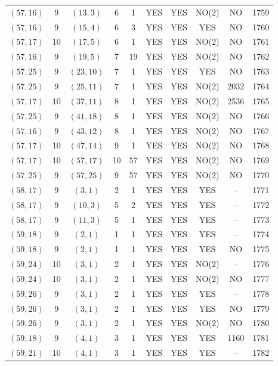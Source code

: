 \begin{longtable}{|c|c|c|c|c|c|c|c|c|c|}
$(57, 16)$ & 9 & $(13, 3)$ & 6 & 1 & YES & YES & NO(2) & NO & 1759\\
$(57, 16)$ & 9 & $(15, 4)$ & 6 & 3 & YES & YES & YES & NO & 1760\\
$(57, 17)$ & 10 & $(17, 5)$ & 6 & 1 & YES & YES & NO(2) & NO & 1761\\
$(57, 16)$ & 9 & $(19, 5)$ & 7 & 19 & YES & YES & NO(2) & NO & 1762\\
$(57, 25)$ & 9 & $(23, 10)$ & 7 & 1 & YES & YES & YES & NO & 1763\\
$(57, 25)$ & 9 & $(25, 11)$ & 7 & 1 & YES & YES & NO(2) & 2032 & 1764\\
$(57, 17)$ & 10 & $(37, 11)$ & 8 & 1 & YES & YES & NO(2) & 2536 & 1765\\
$(57, 25)$ & 9 & $(41, 18)$ & 8 & 1 & YES & YES & NO(2) & NO & 1766\\
$(57, 16)$ & 9 & $(43, 12)$ & 8 & 1 & YES & YES & NO(2) & NO & 1767\\
$(57, 17)$ & 10 & $(47, 14)$ & 9 & 1 & YES & YES & NO(2) & NO & 1768\\
$(57, 17)$ & 10 & $(57, 17)$ & 10 & 57 & YES & YES & NO(2) & NO & 1769\\
$(57, 25)$ & 9 & $(57, 25)$ & 9 & 57 & YES & YES & NO(2) & NO & 1770\\
$(58, 17)$ & 9 & $(3, 1)$ & 2 & 1 & YES & YES & YES & -- & 1771\\
$(58, 17)$ & 9 & $(10, 3)$ & 5 & 2 & YES & YES & YES & -- & 1772\\
$(58, 17)$ & 9 & $(11, 3)$ & 5 & 1 & YES & YES & YES & -- & 1773\\
$(59, 18)$ & 9 & $(2, 1)$ & 1 & 1 & YES & YES & YES & -- & 1774\\
$(59, 18)$ & 9 & $(2, 1)$ & 1 & 1 & YES & YES & YES & NO & 1775\\
$(59, 24)$ & 10 & $(3, 1)$ & 2 & 1 & YES & YES & NO(2) & -- & 1776\\
$(59, 24)$ & 10 & $(3, 1)$ & 2 & 1 & YES & YES & NO(2) & NO & 1777\\
$(59, 26)$ & 9 & $(3, 1)$ & 2 & 1 & YES & YES & YES & -- & 1778\\
$(59, 26)$ & 9 & $(3, 1)$ & 2 & 1 & YES & YES & YES & NO & 1779\\
$(59, 26)$ & 9 & $(3, 1)$ & 2 & 1 & YES & YES & NO(2) & NO & 1780\\
$(59, 18)$ & 9 & $(4, 1)$ & 3 & 1 & YES & YES & YES & 1160 & 1781\\
$(59, 21)$ & 10 & $(4, 1)$ & 3 & 1 & YES & YES & YES & -- & 1782\\

\end{longtable}
